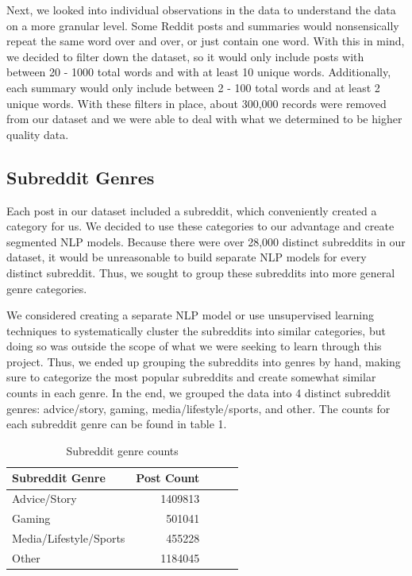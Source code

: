 \documentclass[11pt,a4paper, twocolumn]{article}
\begin{document}
Next, we looked into individual observations in the data to understand the data on a more granular level. 
Some Reddit posts and summaries would nonsensically repeat the same word over and over, or just contain one word. 
With this in mind, we decided to filter down the dataset, so it would only include posts with between 20 - 1000 total words and with at least 10 unique words. 
Additionally, each summary would only include between 2 - 100 total words and at least 2 unique words. 
With these filters in place, about 300,000 records were removed from our dataset and we were able to deal with what we determined to be higher quality data. 

\subsection{Subreddit Genres}

Each post in our dataset included a subreddit, which conveniently created a category for us. 
We decided to use these categories to our advantage and create segmented NLP models. 
Because there were over 28,000 distinct subreddits in our dataset, it would be unreasonable to build separate NLP models for every distinct subreddit. 
Thus, we sought to group these subreddits into more general genre categories. 

We considered creating a separate NLP model or use unsupervised learning techniques to systematically cluster the subreddits into similar categories, 
but doing so was outside the scope of what we were seeking to learn through this project. 
Thus, we ended up grouping the subreddits into genres by hand, making sure to categorize the most popular subreddits and create somewhat similar counts in each genre. 
In the end, we grouped the data into 4 distinct subreddit genres: advice/story, gaming, media/lifestyle/sports, and other. 
The counts for each subreddit genre can be found in table 1.

\begin{table}[h]
  \centering
  \begin{tabular}{lrlll}
  \hline \textbf{Subreddit Genre} & \textbf{Post Count}\\ \hline
  Advice/Story & 1409813 \\
  Gaming & 501041 \\
  Media/Lifestyle/Sports & 455228 \\
  Other & 1184045 \\
  \hline
  \end{tabular}
  \caption{\label{subreddit_counts} Subreddit genre counts}
\end{table}
\end{document}
